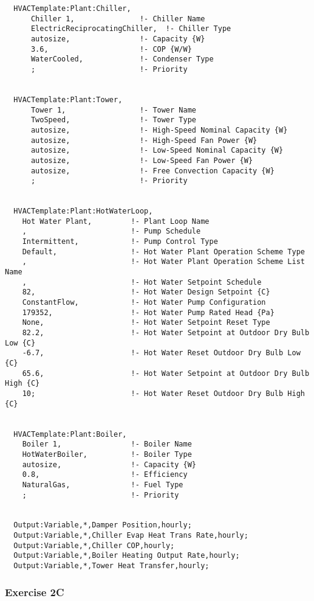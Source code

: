 \begin{lstlisting}
  HVACTemplate:Plant:Chiller,
      Chiller 1,               !- Chiller Name
      ElectricReciprocatingChiller,  !- Chiller Type
      autosize,                !- Capacity {W}
      3.6,                     !- COP {W/W}
      WaterCooled,             !- Condenser Type
      ;                        !- Priority


  HVACTemplate:Plant:Tower,
      Tower 1,                 !- Tower Name
      TwoSpeed,                !- Tower Type
      autosize,                !- High-Speed Nominal Capacity {W}
      autosize,                !- High-Speed Fan Power {W}
      autosize,                !- Low-Speed Nominal Capacity {W}
      autosize,                !- Low-Speed Fan Power {W}
      autosize,                !- Free Convection Capacity {W}
      ;                        !- Priority


  HVACTemplate:Plant:HotWaterLoop,
    Hot Water Plant,         !- Plant Loop Name
    ,                        !- Pump Schedule
    Intermittent,            !- Pump Control Type
    Default,                 !- Hot Water Plant Operation Scheme Type
    ,                        !- Hot Water Plant Operation Scheme List Name
    ,                        !- Hot Water Setpoint Schedule
    82,                      !- Hot Water Design Setpoint {C}
    ConstantFlow,            !- Hot Water Pump Configuration
    179352,                  !- Hot Water Pump Rated Head {Pa}
    None,                    !- Hot Water Setpoint Reset Type
    82.2,                    !- Hot Water Setpoint at Outdoor Dry Bulb Low {C}
    -6.7,                    !- Hot Water Reset Outdoor Dry Bulb Low {C}
    65.6,                    !- Hot Water Setpoint at Outdoor Dry Bulb High {C}
    10;                      !- Hot Water Reset Outdoor Dry Bulb High {C}


  HVACTemplate:Plant:Boiler,
    Boiler 1,                !- Boiler Name
    HotWaterBoiler,          !- Boiler Type
    autosize,                !- Capacity {W}
    0.8,                     !- Efficiency
    NaturalGas,              !- Fuel Type
    ;                        !- Priority


  Output:Variable,*,Damper Position,hourly;
  Output:Variable,*,Chiller Evap Heat Trans Rate,hourly;
  Output:Variable,*,Chiller COP,hourly;
  Output:Variable,*,Boiler Heating Output Rate,hourly;
  Output:Variable,*,Tower Heat Transfer,hourly;
\end{lstlisting}

\subsubsection{Exercise 2C}\label{exercise-2c}

